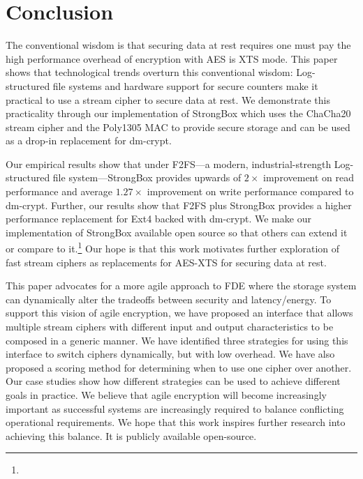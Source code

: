 \chapter{Conclusion} \label{chp:conclusion}


The conventional wisdom is that securing data at rest requires one must pay the
high performance overhead of encryption with AES is XTS mode. This paper shows
that technological trends overturn this conventional wisdom: Log-structured file
systems and hardware support for secure counters make it practical to use a
stream cipher to secure data at rest. We demonstrate this practicality through
our implementation of StrongBox which uses the ChaCha20 stream cipher and the
Poly1305 MAC to provide secure storage and can be used as a drop-in replacement
for dm-crypt.

Our empirical results show that under F2FS---a modern, industrial-strength
Log-structured file system---StrongBox provides upwards of $2\times$ improvement
on read performance and average $1.27\times$ improvement on write performance
compared to dm-crypt. Further, our results show that F2FS plus StrongBox
provides a higher performance replacement for Ext4 backed with dm-crypt. We make
our implementation of StrongBox available open source so that others can extend
it or compare to it.\footnote{\StrongBoxURI} Our hope is that this work
motivates further exploration of fast stream ciphers as replacements for AES-XTS
for securing data at rest.





This paper advocates for a more agile approach to FDE where the storage system
can dynamically alter the tradeoffs between security and latency/energy. To
support this vision of agile encryption, we have proposed an interface that
allows multiple stream ciphers with different input and output characteristics
to be composed in a generic manner. We have identified three strategies for
using this interface to switch ciphers dynamically, but with low overhead. We
have also proposed a scoring method for determining when to use one cipher over
another. Our case studies show how different strategies can be used to achieve
different goals in practice. We believe that agile encryption will become
increasingly important as successful systems are increasingly required to
balance conflicting operational requirements. We hope that this work inspires
further research into achieving this balance. It is publicly available
open-source.





